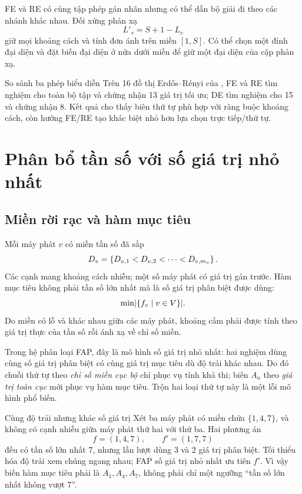 FE và RE có cùng tập phép gán nhãn nhưng có thể dẫn bộ giải đi theo các nhánh
khác nhau. Đối xứng phản xạ
\[
  L'_v=S+1-L_v
\]
giữ mọi khoảng cách và tính đơn ánh trên miền \([1,S]\). Có thể chọn một đỉnh
đại diện và đặt biến đại diện ở nửa dưới miền để giữ một đại diện của cặp phản xạ.

\begin{resultbox}{So sánh ba phép biểu diễn}
Trên 16 đồ thị Erdős--Rényi của \textcite{thanh2026ksafe}, FE và RE tìm nghiệm
cho toàn bộ tập và chứng nhận 13 giá trị tối ưu; DE tìm nghiệm cho 15 và chứng
nhận 8. Kết quả cho thấy biên thứ tự phù hợp với ràng buộc khoảng cách, còn
hướng FE/RE tạo khác biệt nhỏ hơn lựa chọn trực tiếp/thứ tự.
\end{resultbox}

\section{Phân bổ tần số với số giá trị nhỏ nhất}

\subsection{Miền rời rạc và hàm mục tiêu}

Mỗi máy phát \(v\) có miền tần số đã sắp
\[
  D_v=\left\{D_{v,1}<D_{v,2}<\cdots<D_{v,m_v}\right\}.
\]
Các cạnh mang khoảng cách nhiễu; một số máy phát có giá trị gán trước. Hàm mục
tiêu không phải tần số lớn nhất mà là số giá trị phân biệt được dùng:
\[
  \min\lvert \left\{f_v\mid v\in V\right\}\rvert.
\]
Do miền có lỗ và khác nhau giữa các máy phát, khoảng cấm phải được
tính theo giá trị thực của tần số rồi ánh xạ về chỉ số miền.

Trong hệ phân loại FAP, đây là mô hình số giá trị nhỏ nhất: hai nghiệm dùng cùng
số giá trị phân biệt có cùng giá trị mục tiêu dù độ trải khác nhau. Do đó chuỗi
thứ tự theo \emph{chỉ số miền cục bộ} chỉ phục vụ tính khả thi; biến \(A_a\)
theo \emph{giá trị toàn cục} mới phục vụ hàm mục tiêu. Trộn hai loại thứ tự này là một
lỗi mô hình phổ biến.

\begin{workedexample}{Cùng độ trải nhưng khác số giá trị}
Xét ba máy phát có miền chứa \(\{1,4,7\}\), và không có cạnh nhiễu giữa máy
phát thứ hai với thứ ba. Hai phương án
\[
  f=(1,4,7),\qquad f'=(1,7,7)
\]
đều có tần số lớn nhất \(7\), nhưng lần lượt dùng \(3\) và \(2\) giá trị phân
biệt. Tối thiểu hóa độ trải xem chúng ngang nhau; FAP số giá trị nhỏ nhất ưu
tiên \(f'\). Vì vậy biến hàm mục tiêu phải là \(A_1,A_4,A_7\), không phải chỉ
một ngưỡng ``tần số lớn nhất không vượt \(7\)''.
\end{workedexample}

